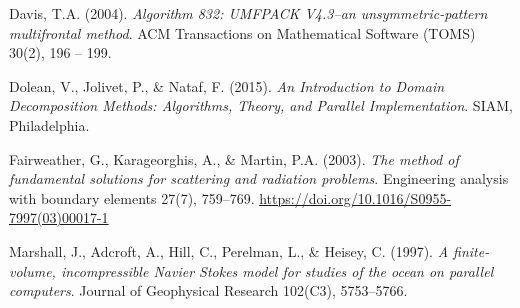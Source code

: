 \documentclass{article}
\begin{document}
	\begin{thebibliography}{9}
		Davis, T.A.
		(2004).
		\emph{Algorithm 832: UMFPACK V4.3--an unsymmetric-pattern multifrontal method}.
		ACM Transactions on Mathematical Software (TOMS)
		30(2), 196 -- 199.
		
		Dolean, V., Jolivet, P., \& Nataf, F.
		(2015).
		\emph{An Introduction to Domain Decomposition Methods: Algorithms, Theory, and Parallel Implementation}.
		SIAM, Philadelphia.
		
		Fairweather, G., Karageorghis, A., \& Martin, P.A.
		(2003).
		\emph{The method of fundamental solutions for scattering and radiation problems}.
		Engineering analysis with boundary elements   
		27(7), 759--769.
		\url{https://doi.org/10.1016/S0955-7997(03)00017-1}
		
		Marshall, J., Adcroft, A., Hill, C., Perelman, L., \& Heisey, C.
		(1997).
		\emph{A finite-volume, incompressible Navier Stokes model for studies of the ocean on parallel computers}.
		Journal of Geophysical Research 
		102(C3), 5753--5766.
		
	\end{thebibliography}
\end{document}

